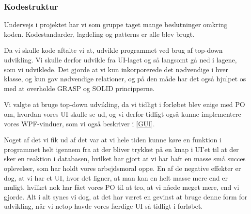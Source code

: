 \subsubsection{Kodestruktur}

Undervejs i projektet har vi som gruppe taget mange beslutninger omkring koden.
Kodestandarder, lagdeling og patterns er alle blev brugt. 

Da vi skulle kode aftalte vi at, udvikle programmet ved brug af top-down udvikling.
Vi skulle derfor udvikle fra UI-laget og så langsomt gå ned i lagene, som vi udviklede.
Det gjorde at vi kun inkorporerede det nødvendige i hver klasse, og kun gav nødvendige relationer, og på den måde har det også hjulpet os med at overholde GRASP og SOLID principperne.

Vi valgte at bruge top-down udvikling, da vi tidligt i forløbet blev enige med PO om, hvordan vores UI skulle se ud, og vi derfor tidligt også kunne implementere vores WPF-vinduer, som vi også beskriver i \ref{GUI}.

Noget af det vi fik ud af det var at vi hele tiden kunne køre en funktion i programmet helt igennem fra at der bliver trykket på en knap i UI'et til at der sker en reaktion i databasen, hvilket har gjort at vi har haft en masse små succes oplevelser, som har holdt vores arbejdsmoral oppe.
En af de negative effekter er dog, at vi har et UI, hvor det ligner, at man kan en helt masse mere end er muligt, hvilket nok har fået vores PO til at tro, at vi nåede meget mere, end vi gjorde.
Alt i alt synes vi dog, at det har været en gevinst at bruge denne form for udvikling, når vi netop havde vores færdige UI så tidligt i forløbet.